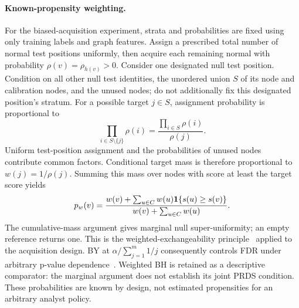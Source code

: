 \paragraph{Known-propensity weighting.}
For the biased-acquisition experiment, strata and probabilities are fixed using only training labels and graph features. Assign a prescribed total number of normal test positions uniformly, then acquire each remaining normal with probability $\rho(v)=\rho_{h(v)}>0$. Consider one designated null test position. Condition on all other null test identities, the unordered union $S$ of its node and calibration nodes, and the unused nodes; do not additionally fix this designated position's stratum. For a possible target $j\in S$, assignment probability is proportional to
\[
\prod_{i\in S\setminus\{j\}}\rho(i)
=\frac{\prod_{i\in S}\rho(i)}{\rho(j)}.
\]
Uniform test-position assignment and the probabilities of unused nodes contribute common factors. Conditional target mass is therefore proportional to $w(j)=1/\rho(j)$. Summing this mass over nodes with score at least the target score yields
\[
p_w(v)=\frac{w(v)+\sum_{u\in C}w(u)\mathbf{1}\{s(u)\ge s(v)\}}
{w(v)+\sum_{u\in C}w(u)}.
\]
The cumulative-mass argument gives marginal null super-uniformity; an empty reference returns one. This is the weighted-exchangeability principle~\citep{tibshirani2019conformal} applied to the acquisition design. BY at $\alpha/\sum_{j=1}^m1/j$ consequently controls FDR under arbitrary p-value dependence~\citep{benjamini2001control}. Weighted BH is retained as a descriptive comparator: the marginal argument does not establish its joint PRDS condition. These probabilities are known by design, not estimated propensities for an arbitrary analyst policy.



